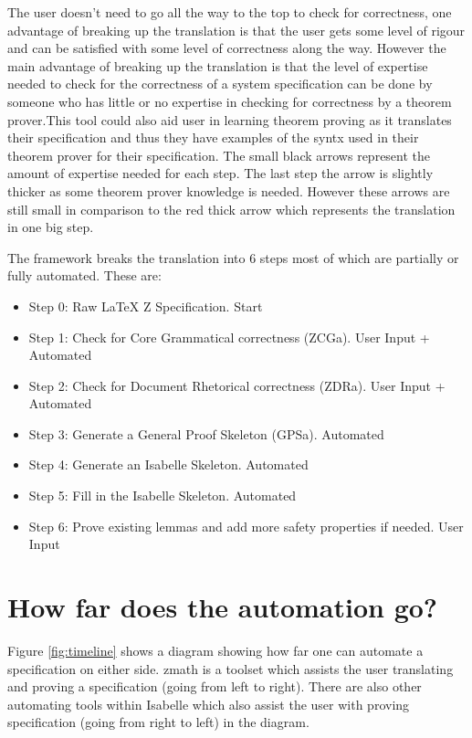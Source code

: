 The user doesn't need to go all the way to the top to check for correctness, one advantage of breaking up the translation is that the user gets some level of rigour and can be satisfied with some level of correctness along the way. However the main advantage of breaking up the translation is that the level of expertise needed to check for the correctness of a system specification can be done by someone who has little or no expertise in checking for correctness by a theorem prover.This tool could also aid user in learning theorem proving as it translates their specification and thus they have examples of the syntx used in their theorem prover for their specification. The small black arrows represent the amount of expertise needed for each step. The last step the arrow is slightly thicker as some theorem prover knowledge is needed. However these arrows are still small in comparison to the red thick arrow which represents the translation in one big step.

The framework breaks the translation into 6 steps most of which are partially or fully automated. These are:

\begin{itemize}
\item Step 0: Raw LaTeX Z Specification. {\color{set}Start}
\item Step 1: Check for Core Grammatical correctness (ZCGa). {\color{set}User Input + Automated}
\item Step 2: Check for Document Rhetorical correctness (ZDRa). {\color{set}User Input + Automated}
\item Step 3: Generate a General Proof Skeleton (GPSa). {\color{set}Automated}
\item Step 4: Generate an Isabelle Skeleton. {\color{set}Automated}
\item Step 5: Fill in the Isabelle Skeleton. {\color{set}Automated}
\item Step 6: Prove existing lemmas and add more safety properties if needed. {\color{set}User Input}
\end{itemize}

\section{How far does the automation go?}

Figure \ref{fig:timeline} shows a diagram showing how far one can automate a specification on either side. \Gls{zmath} is a toolset which assists the user translating and proving a specification (going from left to right). There are also other automating tools within Isabelle which also assist the user with proving specification (going from right to left) in the diagram.

